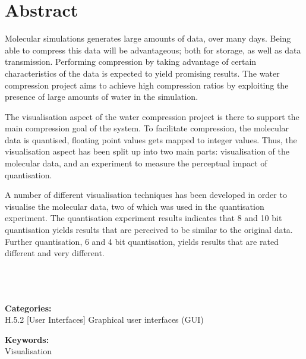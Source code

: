 \thispagestyle{empty}

\section*{Abstract}

Molecular simulations generates large amounts of data, over many days. Being
able to compress this data will be advantageous; both for storage, as well as
data transmission. Performing compression by taking advantage of certain
characteristics of the data is expected to yield promising results. The water
compression project aims to achieve high compression ratios by exploiting the
presence of large amounts of water in the simulation.

The visualisation aspect of the water compression project is there to support
the main compression goal of the system. To facilitate compression, the
molecular data is quantised, floating point values gets mapped to integer
values. Thus, the visualisation aspect has been split up into two main parts:
visualisation of the molecular data, and an experiment to measure the
perceptual impact of quantisation.

A number of different visualisation techniques has been developed in order to
visualise the molecular data, two of which was used in the quantisation
experiment. The quantisation experiment results indicates that 8 and 10 bit
quantisation yields results that are perceived to be similar to the original
data. Further quantisation, 6 and 4 bit quantisation, yields results that are
rated different and very different.

\ \\
\ \\
\ \\

\textbf{Categories:} \\
H.5.2 [User Interfaces] Graphical user interfaces (GUI)

\textbf{Keywords:} \\
Visualisation


